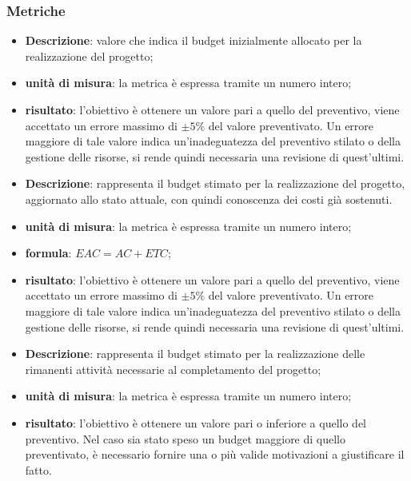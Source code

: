 		\subsubsection{Metriche}
		\begin{itemize}
			\item \textbf{Descrizione}: valore che indica il budget inizialmente allocato per la realizzazione del progetto;
			\item \textbf{unità di misura}: la metrica è espressa tramite un numero intero;
			\item \textbf{risultato}: l'obiettivo è ottenere un valore pari a quello del preventivo, viene accettato un errore massimo di $\pm{}5\%$ del valore preventivato. Un errore maggiore di tale valore indica un'inadeguatezza del preventivo stilato o della gestione delle risorse, si rende quindi necessaria una revisione di quest'ultimi.
		\end{itemize}
		\begin{itemize}
			\item \textbf{Descrizione}: rappresenta il budget stimato per la realizzazione del progetto, aggiornato allo stato attuale, con quindi conoscenza dei costi già sostenuti.
			\item \textbf{unità di misura}: la metrica è espressa tramite un numero intero;
			\item \textbf{formula}: $EAC = AC + ETC$;
			\item \textbf{risultato}: l'obiettivo è ottenere un valore pari a quello del preventivo, viene accettato un errore massimo di $\pm{}5\%$ del valore preventivato. Un errore maggiore di tale valore indica un'inadeguatezza del preventivo stilato o della gestione delle risorse, si rende quindi necessaria una revisione di quest'ultimi.
		\end{itemize}
		\begin{itemize}
			\item \textbf{Descrizione}: rappresenta il budget stimato per la realizzazione delle rimanenti attività necessarie al completamento del progetto;
			\item \textbf{unità di misura}: la metrica è espressa tramite un numero intero;
			\item \textbf{risultato}: l'obiettivo è ottenere un valore pari o inferiore a quello del preventivo. Nel caso sia stato speso un budget maggiore di quello preventivato, è necessario fornire una o più valide motivazioni a giustificare il fatto.
		\end{itemize}
